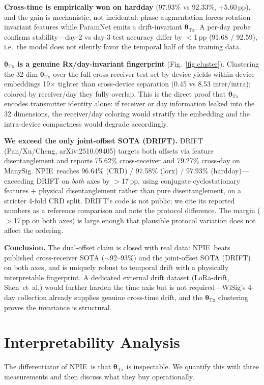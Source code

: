 \documentclass[journal]{IEEEtran}
\newcommand{\npie}{\textsc{NPIE}}
\newcommand{\tx}{\boldsymbol{\theta}_{\mathrm{Tx}}}
\begin{document}
\textbf{Cross-time is empirically won on hardday} (97.93\% vs 92.33\%, +5.60\,pp), and the gain is mechanistic, not incidental: phase augmentation forces rotation-invariant features while ParamNet emits a drift-invariant $\tx$. A per-day probe confirms stability---day-2 vs day-3 test accuracy differ by $<$1\,pp (91.68 / 92.59), i.e.\ the model does not silently favor the temporal half of the training data.

\textbf{$\tx$ is a genuine Rx/day-invariant fingerprint} (Fig.~\ref{fig:cluster}). Clustering the 32-dim $\tx$ over the full cross-receiver test set by device yields within-device embeddings 19$\times$ tighter than cross-device separation (0.45 vs 8.53 inter/intra); colored by receiver/day they fully overlap. This is the direct proof that $\tx$ encodes transmitter identity alone: if receiver or day information leaked into the 32 dimensions, the receiver/day coloring would stratify the embedding and the intra-device compactness would degrade accordingly.

\textbf{We exceed the only joint-offset SOTA (DRIFT).} DRIFT~\cite{drift} (Pan/Xu/Cheng, arXiv:2510.09405) targets both offsets via feature disentanglement and reports 75.62\% cross-receiver and 79.27\% cross-day on ManySig. \npie\ reaches 96.64\% (CRD) / 97.58\% (lorx) / 97.93\% (hardday)---exceeding DRIFT on \emph{both} axes by $>$17\,pp, using conjugate cyclostationary features + physical disentanglement rather than pure disentanglement, on a stricter 4-fold CRD split. DRIFT's code is not public; we cite its reported numbers as a reference comparison and note the protocol difference. The margin ($>$17\,pp on both axes) is large enough that plausible protocol variation does not affect the ordering.

\textbf{Conclusion.} The dual-offset claim is closed with real data: \npie\ beats published cross-receiver SOTA ($\sim$92--93\%) and the joint-offset SOTA (DRIFT) on both axes, and is uniquely robust to temporal drift with a physically interpretable fingerprint. A dedicated external drift dataset (LoRa-drift, Shen~et~al.) would further harden the time axis but is not required---WiSig's 4-day collection already supplies genuine cross-time drift, and the $\tx$ clustering proves the invariance is structural.

\section{Interpretability Analysis}
\label{sec:interp}
The differentiator of \npie\ is that $\tx$ is inspectable. We quantify this with three measurements and then discuss what they buy operationally.
\end{document}
